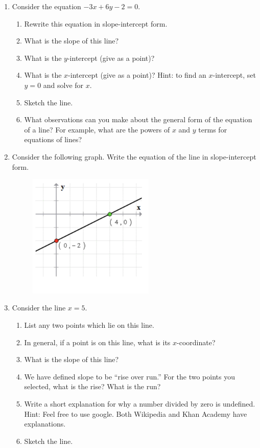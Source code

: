 \documentclass[12pt]{amsart}
\begin{document}
\begin{enumerate}
\item Consider the equation $-3x + 6y -2 = 0$.
 \begin{enumerate}
     \item Rewrite this equation in slope-intercept form.
      \item What is the slope of this line?
     \item What is the $y$-intercept (give as a point)?
     \item What is the $x$-intercept (give as a point)?  Hint: to find an $x$-intercept, set $y=0$ and solve for $x$.
     \item Sketch the line.
     \item What observations can you make about the general form of the equation of a line?  For example, what are the powers of $x$ and $y$ terms for equations of lines?
      \end{enumerate}




\item Consider the following graph.  Write the equation of the line in slope-intercept form.
\begin{figure}[h!]
\includegraphics[width=6cm]{line.png}
\end{figure}
      
      
\item Consider the line $x=5$.
 \begin{enumerate}
     \item List any two points which lie on this line.
      \item In general, if a point is on this line, what is its $x$-coordinate? 
     \item What is the slope of this line?
     \item We have defined slope to be ``rise over run.''  For the two points you selected, what is the rise?  What is the run?
     \item Write a short explanation for why a number divided by zero is undefined.  Hint: Feel free to use google.  Both Wikipedia and Khan Academy have explanations.
      \item Sketch the line.
      \end{enumerate}



\end{enumerate}
\end{document}
